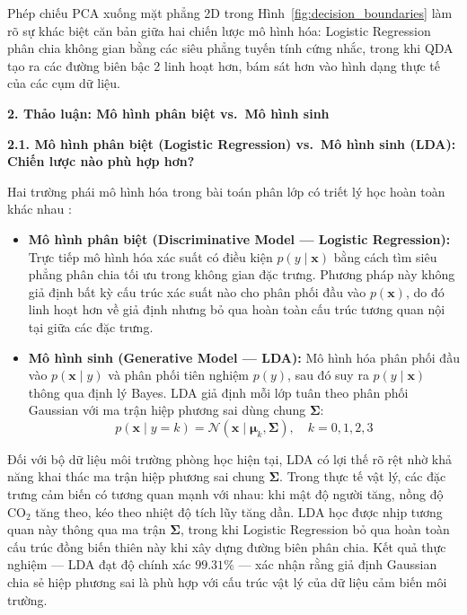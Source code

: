 Phép chiếu PCA xuống mặt phẳng 2D trong Hình~\ref{fig:decision_boundaries} 
làm rõ sự khác biệt căn bản giữa hai chiến lược mô hình hóa: Logistic 
Regression phân chia không gian bằng các siêu phẳng tuyến tính cứng 
nhắc, trong khi QDA tạo ra các đường biên bậc 2 linh hoạt hơn, bám 
sát hơn vào hình dạng thực tế của các cụm dữ liệu.

\noindent\textcolor{infocolor}{\textbf{2. Thảo luận: Mô hình phân biệt vs.\ Mô hình sinh}}
\label{sec:discussion}

\noindent\textcolor{infocolor}{\textbf{2.1. Mô hình phân biệt (Logistic Regression) vs.\ 
Mô hình sinh (LDA): Chiến lược nào phù hợp hơn?}}

Hai trường phái mô hình hóa trong bài toán phân lớp có triết lý 
học hoàn toàn khác nhau \cite{bishop2006pattern}:

\begin{itemize}
    \item \textbf{Mô hình phân biệt (Discriminative Model --- 
    Logistic Regression):} Trực tiếp mô hình hóa xác suất có điều 
    kiện $p(y \mid \boldsymbol{x})$ bằng cách tìm siêu phẳng 
    phân chia tối ưu trong không gian đặc trưng. Phương pháp này 
    không giả định bất kỳ cấu trúc xác suất nào cho phân phối 
    đầu vào $p(\boldsymbol{x})$, do đó linh hoạt hơn về giả định 
    nhưng bỏ qua hoàn toàn cấu trúc tương quan nội tại giữa các 
    đặc trưng.

    \item \textbf{Mô hình sinh (Generative Model --- LDA):} Mô 
    hình hóa phân phối đầu vào $p(\boldsymbol{x} \mid y)$ và phân 
    phối tiên nghiệm $p(y)$, sau đó suy ra $p(y \mid \boldsymbol{x})$ 
    thông qua định lý Bayes. LDA giả định mỗi lớp tuân theo phân 
    phối Gaussian với ma trận hiệp phương sai dùng chung 
    $\boldsymbol{\Sigma}$:
    $$p(\boldsymbol{x} \mid y=k) 
      = \mathcal{N}(\boldsymbol{x} \mid \boldsymbol{\mu}_k, 
        \boldsymbol{\Sigma}), \quad k = 0, 1, 2, 3$$
\end{itemize}

Đối với bộ dữ liệu môi trường phòng học hiện tại, LDA có lợi thế 
rõ rệt nhờ khả năng khai thác ma trận hiệp phương sai chung 
$\boldsymbol{\Sigma}$. Trong thực tế vật lý, các đặc trưng cảm biến 
có tương quan mạnh với nhau: khi mật độ người tăng, nồng độ $\mathrm{CO}_2$ 
tăng theo, kéo theo nhiệt độ tích lũy tăng dần. LDA học được nhịp 
tương quan này thông qua ma trận $\boldsymbol{\Sigma}$, trong khi 
Logistic Regression bỏ qua hoàn toàn cấu trúc đồng biến thiên này 
khi xây dựng đường biên phân chia. Kết quả thực nghiệm --- LDA đạt 
độ chính xác $99.31\%$ --- xác nhận rằng giả định Gaussian chia sẻ 
hiệp phương sai là phù hợp với cấu trúc vật lý của dữ liệu cảm biến 
môi trường.

